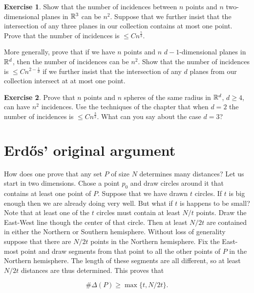 \documentclass[]{amsart}
\numberwithin{equation}{section}
\theoremstyle{plain}
\theoremstyle{definition}
\newtheorem{exercise}{Exercise}[section]
\theoremstyle{remark}
\begin{document}
\begin{exercise} Show that the number of incidences between $n$
points and $n$ two-dimensional planes in ${\Bbb R}^3$ can be $n^2$.
Suppose that we further insist that the intersection of any three planes
in our collection contains at most one point. Prove that the number of
incidences is $\leq Cn^{\frac{5}{3}}$.

More generally, prove that if we have $n$ points and $n$
$d-1$-dimensional planes in ${\Bbb R}^d$, then the number of incidences
can be $n^2$. Show that the number of incidences is $\leq
Cn^{2-\frac{1}{d}}$ if we further insist that the intersection of any $d$
planes from our collection intersect at at most one point.
\end{exercise}

\begin{exercise} Prove that $n$ points and $n$ spheres of the
same radius in ${\Bbb R}^d$, $d \ge 4$, can have $n^2$ incidences. Use
the techniques of the chapter that when $d=2$ the number of incidences is
$\leq Cn^{\frac{3}{2}}$. What can you say about the case
$d=3$? \end{exercise}





\section{Erd\H{o}s' original argument}

How does one prove that any set $P$ of size $N$ determines many
distances? Let us start in two dimensions. Chose a point $p_0$ and
draw circles around it that contains at least one point of $P$.
Suppose that we have drawn $t$ circles. If $t$ is big enough then
we are already doing very well. But what if $t$ is happens to be
small? Note that at least one of the $t$ circles must contain at
least $N/t$ points. Draw the East-West line though the center of
that circle. Then at least $N/2t$ are contained in either the
Northern or Southern hemisphere. Without loss of generality
suppose that there are $N/2t$ points in the Northern hemisphere.
Fix the East-most point and draw segments from that point to all
the other points of $P$ in the Northern hemisphere. The length of
these segments are all different, so at least $N/2t$ distances are
thus determined. This proves that

\begin{equation} \label{max1.eqn}
\# \Delta(P) \ge \max \{t, N/2t\}.
\end{equation}
\end{document}
